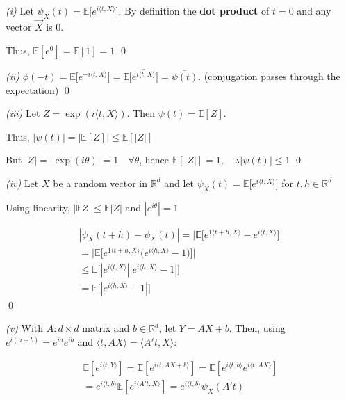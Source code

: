 \documentclass[10pt]{article}
\begin{document}
\textit{(i)} Let $\psi_X(t) = \mathbb{E}\big[e^{i\langle t, X\rangle}\big]$. By definition the \textbf{dot product} of $t=0$ and any vector $\vec{X}$ is $0$.

Thus, $\mathbb{E}[e^0] = \mathbb{E}[1] = 1$ \qed

\hfill 

\textit{(ii)} $\phi(-t) = \mathbb{E}\big[e^{-i\langle t, X\rangle}\big] = \mathbb{E}\big[\overline{e^{i\langle t, X\rangle}}\big] = \overline{\psi(t)}$. (conjugation passes through the expectation) \qed

\hfill 

\textit{(iii)} Let $Z = \exp(i\langle t, X \rangle)$. Then $\psi(t) = \mathbb{E}[Z]$. 

Thus, $|\psi(t)| = |\mathbb{E}[Z]| \leq \mathbb{E}[|Z|]$

But $|Z| = |\exp(i\theta)| = 1 \quad\forall \theta$, hence $\mathbb{E}[|Z|] = 1, \quad\therefore |\psi(t)| \leq 1$ \qed

\hfill

\textit{(iv)}  Let $X$ be a random vector in $\mathbb{R}^d$ and let $\psi_X(t) = \mathbb{E}\big[e^{i\langle t, X\rangle}\big]$ for $t, h \in \mathbb{R}^d$

Using linearity, $|\mathbb{E}Z| \leq \mathbb{E}|Z|$ and $|e^{i\theta}| = 1$

\begin{gather*}
    |\psi_X(t + h) - \psi_X(t)| = \Big|\mathbb{E}\big[e^{1\langle t + h, X\rangle} - e^{i\langle t, X\rangle}\big]\Big| \\
    = \Big|\mathbb{E}\big[e^{1\langle t + h, X\rangle} \big(e^{i\langle h, X\rangle} - 1\big)\big]\Big| \\
    \leq \mathbb{E}\big[|e^{i\langle t, X\rangle}| |e^{i\langle h, X\rangle} - 1|\big]\\
    = \mathbb{E}\big[|e^{i\langle h, X\rangle} - 1|\big]
\end{gather*}
\qed

\hfill 

\textit{(v)} With $A: d \times d$ matrix and $b \in \mathbb{R}^d$, let $Y = AX + b$. Then, using $e^{i(a + b)} = e^{ia}e^{ib}$ and $\langle t, AX \rangle = \langle A't, X \rangle$:

\begin{gather*}
    \mathbb{E}[e^{i\langle t, Y \rangle}] = \mathbb{E}[e^{i\langle t, AX + b \rangle}] = \mathbb{E}[e^{i\langle t, b \rangle}e^{i\langle t, AX \rangle}] \\
    = e^{i\langle t, b \rangle}\mathbb{E}[e^{i\langle A't, X \rangle}] = e^{i\langle t, b \rangle}\psi_X(A't)
\end{gather*}
\end{document}
